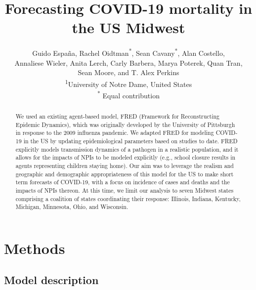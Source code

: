 \documentclass[11pt]{article}
\date{}
\title{Forecasting COVID-19 mortality in the US Midwest}
\author{Guido Espa\~na,  Rachel Oidtman\textsuperscript{*}, Sean Cavany\textsuperscript{*}, Alan Costello, \\Annaliese Wieler, Anita Lerch, Carly Barbera,  Marya Poterek, Quan Tran,\\ Sean Moore, and T. Alex Perkins\\
  \textsuperscript{1}University of Notre Dame, United States\\  
  \textsuperscript{*} Equal contribution
}
\begin{document}
  
\linenumbers
\maketitle

\setcounter{page}{1}
\begin{abstract}
We used an existing agent-based model, FRED (Framework for Reconstructing Epidemic Dynamics), which was originally developed by the University of Pittsburgh in response to the 2009 influenza pandemic. We adapted FRED for modeling COVID-19 in the US by updating epidemiological parameters based on studies to date. FRED explicitly models transmission dynamics of a pathogen in a realistic population, and it allows for the impacts of NPIs to be modeled explicitly (e.g., school closure results in agents representing children staying home). Our aim was to leverage the realism and geographic and demographic appropriateness of this model for the US to make short term forecasts of COVID-19, with a focus on incidence of cases and deaths and the impacts of NPIs thereon. At this time, we limit our analysis to seven Midwest states comprising a coalition of states coordinating their response: Illinois, Indiana, Kentucky, Michigan, Minnesota, Ohio, and Wisconsin.
\end{abstract}

\section{Methods}
\subsection{Model description}
\end{document}
